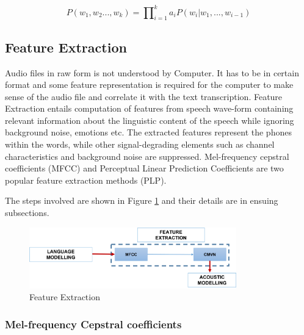 \documentclass[lettersize,journal]{IEEEtran}
\begin{document}

\begin{equation}
P(w_{1},w_{2}...,w_{k}) = \prod\nolimits_{i = 1}^{k} a_{i} P(w_{i} | w_{1},...,w_{i-1})
\end{equation}


\subsection{Feature Extraction}
\label{sec:feature-extraction}
Audio files in raw form is not understood by Computer. It has to be in certain format and some feature representation is required for the computer to make sense of the audio file and correlate it with the text transcription. Feature Extraction entails computation of features from speech wave-form containing relevant information about the linguistic content of the speech while ignoring background noise, emotions etc. The extracted features represent the phones within the words, while other signal-degrading elements such as channel characteristics and background noise are suppressed. Mel-frequency cepstral coefficients (MFCC) and Perceptual Linear Prediction Coefficients are two popular feature extraction methods (PLP). %

The steps involved are shown in Figure \ref{fig:working_pipeline-3} and their details are in ensuing subsections.

\begin{figure}[h]
    \centering
    \includegraphics[width=0.8\textwidth]{img/workflow-3.png}
    \caption{Feature Extraction}
    \label{fig:working_pipeline-3}
\end{figure}


\subsubsection{Mel-frequency Cepstral coefficients}
\label{sub:MFCC-trg}
\end{document}
